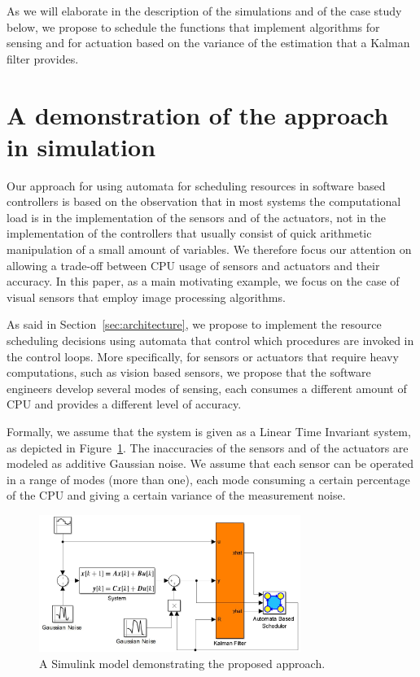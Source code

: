 \documentclass{sig-alternate-ipsn13}
\begin{document}
As we will elaborate in the description of the simulations and of the case study below, we propose to schedule the functions that implement algorithms for sensing and for actuation based on the variance of the estimation that a Kalman filter provides. 



\section{A demonstration of the approach in simulation}

Our approach for using automata for scheduling resources in software based controllers is based on the observation that in most systems the computational load is in the implementation of the sensors and of the actuators, not in the implementation of the controllers that usually consist of quick arithmetic manipulation of a small amount of variables. We therefore focus our attention on allowing a trade-off between CPU usage of sensors and actuators and their accuracy. In this paper, as a main motivating example, we focus on the case of visual sensors that employ image processing algorithms.

As said in Section~\ref{sec:architecture}, we propose to implement the resource scheduling decisions using automata that control which procedures are invoked in the control loops. More specifically, for sensors or actuators that require heavy computations, such as vision based sensors, we propose that the software engineers develop several modes of sensing, each consumes a different amount of CPU and provides a different level of accuracy. 

Formally, we assume that the system is given as a Linear Time Invariant system, as depicted in Figure~\ref{fig:simulink}. The inaccuracies of the sensors and of the actuators are modeled as additive Gaussian noise. We assume that each sensor can be operated in a range of modes (more than one), each mode consuming a certain percentage of the CPU and giving a certain variance of the measurement noise.

\begin{figure}%
	\centerline{\includegraphics[width=85mm]{SimulinkModel.jpg}}
	\caption{A Simulink model demonstrating the proposed approach.}
	\label{fig:simulink}
\end{figure}
\end{document}
